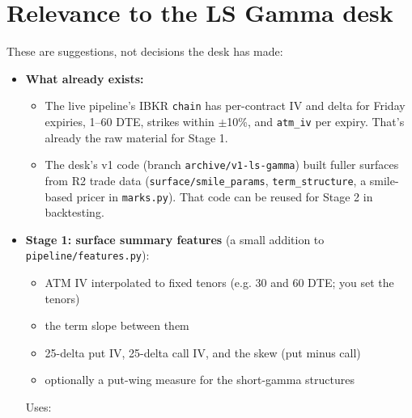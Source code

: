 \documentclass{article}
\begin{document}
\section{Relevance to the LS Gamma desk}

These are suggestions, not decisions the desk has made:

\begin{itemize}

\item \textbf{What already exists:}

\begin{itemize}

\item The live pipeline's IBKR \texttt{chain} has per-contract IV and delta for Friday expiries, 1--60 DTE, strikes within \ensuremath{\pm}10\%, and \texttt{atm\_\allowbreak{}iv} per expiry. That's already the raw material for Stage 1.

\item The desk's v1 code (branch \texttt{archive/\allowbreak{}v1-\allowbreak{}ls-\allowbreak{}gamma}) built fuller surfaces from R2 trade data (\texttt{surface/\allowbreak{}smile\_\allowbreak{}params}, \texttt{term\_\allowbreak{}structure}, a smile-based pricer in \texttt{marks.\allowbreak{}py}). That code can be reused for Stage 2 in backtesting.

\end{itemize}

\item \textbf{Stage 1: surface summary features} (a small addition to \texttt{pipeline/\allowbreak{}features.\allowbreak{}py}):

\begin{itemize}

\item ATM IV interpolated to fixed tenors (e.g. 30 and 60 DTE; you set the tenors)

\item the term slope between them

\item 25-delta put IV, 25-delta call IV, and the skew (put minus call)

\item optionally a put-wing measure for the short-gamma structures

\end{itemize}

Uses:

\begin{enumerate}


\end{enumerate}
\end{itemize}
\end{document}
